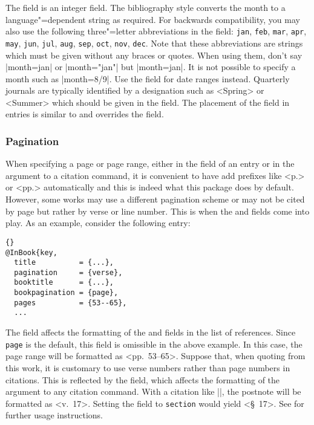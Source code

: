 \documentclass{ltxdockit}[2011/03/25]
\newcommand*{\biblatex}{\sty{biblatex}\xspace}
\begin{document}
The  field is an integer field. The bibliography style converts the month to a language"=dependent string as required. For backwards compatibility, you may also use the following three"=letter abbreviations in the  field: \texttt{jan}, \texttt{feb}, \texttt{mar}, \texttt{apr}, \texttt{may}, \texttt{jun}, \texttt{jul}, \texttt{aug}, \texttt{sep}, \texttt{oct}, \texttt{nov}, \texttt{dec}. Note that these abbreviations are \bibtex strings which must be given without any braces or quotes. When using them, don't say |month={jan}| or |month="jan"| but |month=jan|. It is not possible to specify a month such as |month={8/9}|. Use the  field for date ranges instead. Quarterly journals are typically identified by a designation such as <Spring> or <Summer> which should be given in the  field. The placement of the  field in  entries is similar to and overrides the  field.

\subsubsection{Pagination}
\label{bib:use:pag}

When specifying a page or page range, either in the  field of an entry or in the  argument to a citation command, it is convenient to have \biblatex add prefixes like <p.> or <pp.> automatically and this is indeed what this package does by default. However, some works may use a different pagination scheme or may not be cited by page but rather by verse or line number. This is when the  and  fields come into play. As an example, consider the following entry:

\begin{lstlisting}[style=bibtex]{}
@InBook{key,
  title          = {...},
  pagination     = {verse},
  booktitle      = {...},
  bookpagination = {page},
  pages          = {53--65},
  ...
\end{lstlisting}
%
The  field affects the formatting of the  and  fields in the list of references. Since \texttt{page} is the default, this field is omissible in the above example. In this case, the page range will be formatted as <pp.~53--65>. Suppose that, when quoting from this work, it is customary to use verse numbers rather than page numbers in citations. This is reflected by the  field, which affects the formatting of the  argument to any citation command. With a citation like |\cite[17]{key}|, the postnote will be formatted as <v.~17>. Setting the  field to \texttt{section} would yield <\S~17>. See  for further usage instructions.
\end{document}
